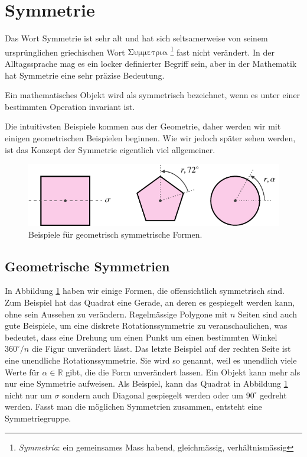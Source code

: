 \section{Symmetrie}
Das Wort Symmetrie ist sehr alt und hat sich seltsamerweise von seinem
ursprünglichen griechischen Wort
\(\mathrm{\Sigma\upsilon\mu\mu\varepsilon\tau\rho\iota\alpha}\)
\footnote{\emph{Symmetr\'ia}: ein gemeinsames Mass habend, gleichmässig,
verhältnismässig} fast nicht verändert. In der Alltagssprache mag es ein
locker definierter Begriff sein, aber in der Mathematik hat Symmetrie eine sehr
präzise Bedeutung.
\begin{definition}[Symmetrie]
	Ein mathematisches Objekt wird als symmetrisch bezeichnet, wenn es unter einer
	bestimmten Operation invariant ist.
\end{definition}
Die intuitivsten Beispiele kommen aus der Geometrie, daher werden wir mit
einigen geometrischen Beispielen beginnen. Wie wir jedoch später sehen werden,
ist das Konzept der Symmetrie eigentlich viel allgemeiner.  

\begin{figure}
	\centering
	\includegraphics{papers/punktgruppen/figures/symmetric-shapes}
	\caption{
		Beispiele für geometrisch symmetrische Formen.
		\label{fig:punktgruppen:geometry-example}
	}
\end{figure}

\subsection{Geometrische Symmetrien}

In Abbildung \ref{fig:punktgruppen:geometry-example} haben wir einige Formen,
die offensichtlich symmetrisch sind.  Zum Beispiel hat das Quadrat eine Gerade,
an deren es gespiegelt werden kann, ohne sein Aussehen zu verändern.
Regelmässige Polygone mit \(n\) Seiten sind auch gute Beispiele, um eine
diskrete Rotationssymmetrie zu veranschaulichen, was bedeutet, dass eine
Drehung um einen Punkt um einen bestimmten Winkel \(360^\circ/n\) die Figur
unverändert lässt.  Das letzte Beispiel auf der rechten Seite ist eine
unendliche Rotationssymmetrie. Sie wird so genannt, weil es unendlich viele
Werte für \(\alpha \in \mathbb{R}\) gibt, die die Form unverändert lassen.  Ein
Objekt kann mehr als nur eine Symmetrie aufweisen.  Als Beispiel, kann das
Quadrat in Abbildung \ref{fig:punktgruppen:geometry-example} nicht nur um
\(\sigma\) sondern auch Diagonal gespiegelt werden oder um \(90^\circ\) gedreht
werden.  Fasst man die möglichen Symmetrien zusammen, entsteht eine
Symmetriegruppe.

